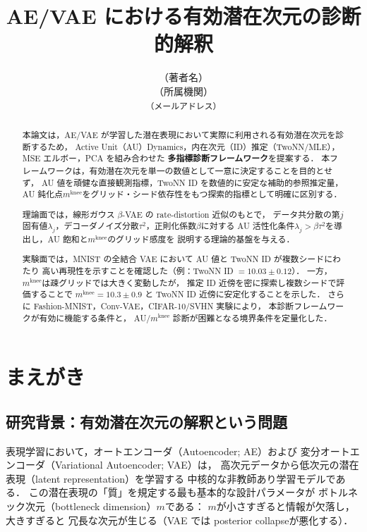\documentclass[11pt,a4paper]{jsarticle}
\title{AE/VAE における有効潜在次元の診断的解釈}
\author{（著者名）\\
{\small （所属機関）}\\
{\small \texttt{（メールアドレス）}}}
\date{}
\newcommand{\mknee}{m^{\mathrm{knee}}}
\begin{document}
\maketitle

\begin{abstract}
本論文は，AE/VAE が学習した潜在表現において実際に利用される有効潜在次元を診断するため，
Active Unit（AU）Dynamics，内在次元（ID）推定（TwoNN/MLE），MSE エルボー，PCA を組み合わせた
\textbf{多指標診断フレームワーク}を提案する．
本フレームワークは，有効潜在次元を単一の数値として一意に決定することを目的とせず，
AU 値を頑健な直接観測指標，TwoNN ID を数値的に安定な補助的参照推定量，
AU 鈍化点$\mknee$をグリッド・シード依存性をもつ探索的指標として明確に区別する．

理論面では，線形ガウス $\beta$-VAE の rate-distortion 近似のもとで，
データ共分散の第$j$固有値$\lambda_j$，デコーダノイズ分散$\tau^2$，正則化係数$\beta$に対する
AU 活性化条件$\lambda_j > \beta\tau^2$を導出し，AU 飽和と$\mknee$のグリッド感度を
説明する理論的基盤を与える．

実験面では，MNIST の全結合 VAE において AU 値と TwoNN ID が複数シードにわたり
高い再現性を示すことを確認した（例：TwoNN ID $= 10.03 \pm 0.12$）．
一方，$\mknee$は疎グリッドでは大きく変動したが，
推定 ID 近傍を密に探索し複数シードで評価することで
$\mknee = 10.3 \pm 0.9$ と TwoNN ID 近傍に安定化することを示した．
さらに Fashion-MNIST，Conv-VAE，CIFAR-10/SVHN 実験により，
本診断フレームワークが有効に機能する条件と，
AU/$\mknee$ 診断が困難となる境界条件を定量化した．
\end{abstract}

\section{まえがき}\label{sec:intro}

\subsection{研究背景：有効潜在次元の解釈という問題}\label{sec:intro_bg}

表現学習において，オートエンコーダ（Autoencoder; AE）および
変分オートエンコーダ（Variational Autoencoder; VAE）\cite{kingma2014vae}は，
高次元データから低次元の潜在表現（latent representation）を学習する
中核的な非教師あり学習モデルである\cite{bengio2013representation}．
この潜在表現の「質」を規定する最も基本的な設計パラメータが
ボトルネック次元（bottleneck dimension）$m$である：
$m$が小さすぎると情報が欠落し，大きすぎると
冗長な次元が生じる（VAE では posterior collapse\cite{lucas2019elbo}が悪化する）．
\end{document}
